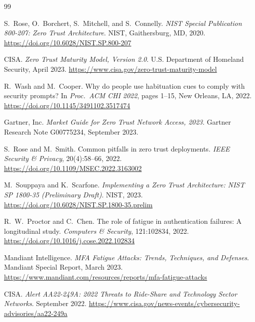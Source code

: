 \documentclass[sigconf,nonacm]{acmart}
\begin{document}
\sloppy

\begin{thebibliography}{99}

S.~Rose, O.~Borchert, S.~Mitchell, and S.~Connelly.
\newblock \textit{NIST Special Publication 800-207: Zero Trust Architecture}.
\newblock NIST, Gaithersburg, MD, 2020.
\newblock \url{https://doi.org/10.6028/NIST.SP.800-207}

CISA.
\newblock \textit{Zero Trust Maturity Model, Version 2.0}.
\newblock U.S. Department of Homeland Security, April 2023.
\newblock \url{https://www.cisa.gov/zero-trust-maturity-model}

R.~Wash and M.~Cooper.
\newblock Why do people use habituation cues to comply with security prompts?
\newblock In \textit{Proc.\ ACM CHI 2022}, pages 1--15, New Orleans, LA, 2022.
\newblock \url{https://doi.org/10.1145/3491102.3517474}

Gartner, Inc.
\newblock \textit{Market Guide for Zero Trust Network Access, 2023}.
\newblock Gartner Research Note G00775234, September 2023.

S.~Rose and M.~Smith.
\newblock Common pitfalls in zero trust deployments.
\newblock \textit{IEEE Security \& Privacy}, 20(4):58--66, 2022.
\newblock \url{https://doi.org/10.1109/MSEC.2022.3163002}

M.~Souppaya and K.~Scarfone.
\newblock \textit{Implementing a Zero Trust Architecture: NIST SP 1800-35
(Preliminary Draft)}.
\newblock NIST, 2023.
\newblock \url{https://doi.org/10.6028/NIST.SP.1800-35.prelim}

R.~W.~Proctor and C.~Chen.
\newblock The role of fatigue in authentication failures: A longitudinal study.
\newblock \textit{Computers \& Security}, 121:102834, 2022.
\newblock \url{https://doi.org/10.1016/j.cose.2022.102834}

Mandiant Intelligence.
\newblock \textit{MFA Fatigue Attacks: Trends, Techniques, and Defenses}.
\newblock Mandiant Special Report, March 2023.
\newblock \url{https://www.mandiant.com/resources/reports/mfa-fatigue-attacks}

CISA.
\newblock \textit{Alert AA22-249A: 2022 Threats to Ride-Share and Technology
Sector Networks}.
\newblock September 2022.
\newblock \url{https://www.cisa.gov/news-events/cybersecurity-advisories/aa22-249a}


\end{thebibliography}
\end{document}
